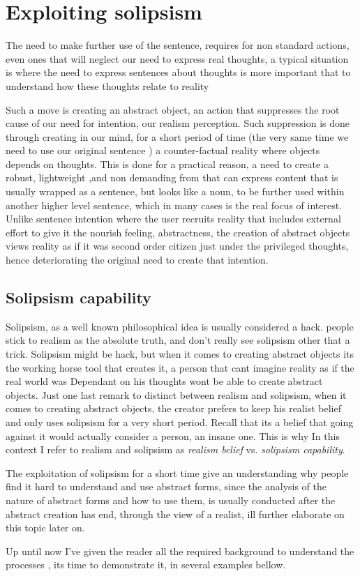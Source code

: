 \documentclass[10pt]{article}
\begin{document}
\section*{Exploiting solipsism}
The need to make further use of the sentence, requires  for non standard actions, even ones that will neglect our need to express real thoughts, a typical situation is where the need to express sentences about thoughts is more important that to understand how these thoughts relate to reality\par
Such a move is creating an abstract object, an action that suppresses the root cause of our need for intention, our realism perception. Such suppression is done through creating in our mind, for a short period of time (the very same time we need to use our original sentence ) a counter-factual reality where objects depends on thoughts. This is done for a practical reason, a need to create a robust, lightweight ,and non demanding  from that can express content that is usually wrapped as a sentence, but looks like a noun, to be further used within another higher level sentence, which in many cases is the real focus of interest. Unlike sentence intention where the user recruits reality that includes external effort to give it the nourish feeling, abstractness, the creation of abstract objects views reality as if it was second order citizen just under the privileged thoughts, hence deteriorating the original need to create that intention.\par

\subsection*{Solipsism capability}
Solipsism, as a well known philosophical idea is usually considered a hack. people  stick to realism as the absolute truth, and don't really see solipsism other that a  trick. Solipsism might be hack, but when it comes to creating abstract objects its the working horse tool that creates it, a person that cant imagine reality as if the real world was Dependant on his thoughts wont be able to create abstract objects.
Just one last remark to distinct between realism and solipsism, when it comes to creating abstract objects, the creator prefers to keep his realist belief and only uses solipsism for a very short period. Recall that its a belief that going against it would actually consider a person, an insane one. This is why In this context I refer to realism and solipsism as \textit{realism belief} vs. \textit{solipsism capability}.\par
The exploitation of solipsism for a short time give an understanding why people find it hard to understand and use abstract forms, since the analysis of the nature of abstract forms and how to use them, is usually conducted after the abstract creation has end, through the view of a realist, ill further elaborate on this topic later on.\par
Up until now I've given the reader all the required background to understand the processes , its time to demonstrate it, in several examples bellow.\par
\end{document}
